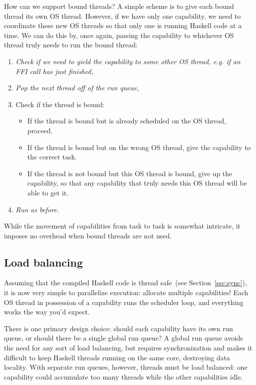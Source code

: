 How can we support bound threads?  A simple scheme is to give each bound
thread its own OS thread.  However, if we have only one capability, we
need to coordinate these new OS threads so that only one is running
Haskell code at a time.  We can do this by, once again, passing the
capability to whichever OS thread truly needs to run the bound thread:

\begin{enumerate}
    \item \emph{Check if we need to yield the capability to some other OS thread, e.g. if an FFI call has just finished,}
    \item \emph{Pop the next thread off of the run queue,}
    \item Check if the thread is bound:
        \begin{itemize}
            \item If the thread is bound but is already scheduled on the OS thread, proceed.
            \item If the thread is bound but on the wrong OS thread, give the capability to the correct task.
            \item If the thread is not bound but this OS thread is bound, give up the capability, so that any capability that truly needs this OS thread will be able to get it.
        \end{itemize}
    \item \emph{Run as before.}
\end{enumerate}

While the movement of capabilities from task to task is somewhat intricate,
it imposes no overhead when bound threads are not used.

\subsection{Load balancing}

Assuming that the compiled Haskell code is thread safe~(see
Section~\ref{sec:sync}), it is now very simple to parallelize execution:
allocate multiple capabilities!  Each OS thread in possession of a
capability runs the scheduler loop, and everything works the way you'd
expect.

There is one primary design choice: should each capability have its own
run queue, or should there be a single global run queue?  A global run
queue avoids the need for any sort of load balancing, but requires
synchronization and makes it difficult to keep Haskell threads running on
the same core, destroying data locality.  With separate run queues, however,
threads must be load balanced: one capability could accumulate too many
threads while the other capabilities idle.

